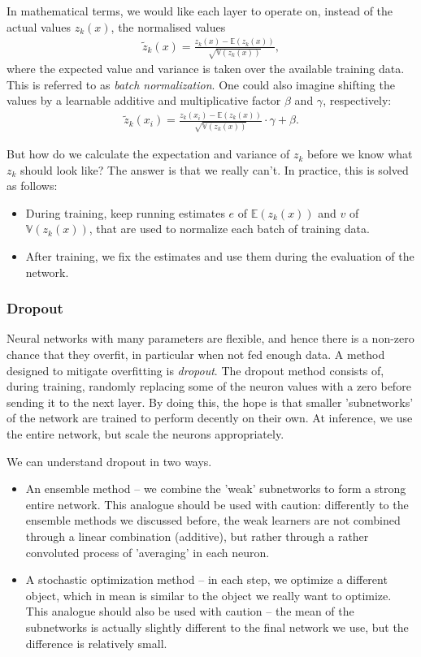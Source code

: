 \documentclass{article}
\begin{document}
In mathematical terms, we would like each layer to operate on, instead of the actual values $z_k(x)$, the normalised values
\begin{align*}
    \tilde{z}_k(x) = \frac{z_k(x) -\mathbb{E}(z_k(x))}{\sqrt{\mathbb{V}(z_k(x))}},
\end{align*}
where the expected value and variance is taken over the available training data. This is referred to as \emph{batch normalization}. One could also imagine shifting the values by a learnable additive and multiplicative factor $\beta$ and $\gamma$, respectively:
\begin{align*}
    \tilde{z}_k(x_i) = \frac{z_k(x_i) -\mathbb{E}(z_k(x))}{\sqrt{\mathbb{V}(z_k(x))}}\cdot \gamma + \beta.
\end{align*}

But how do we calculate the expectation and variance of $z_k$ before we know what $z_k$ should look like? The answer is that we really can't. In practice, this is solved as follows:
\begin{itemize}
    \item During training, keep running estimates $e$ of $\mathbb{E}(z_k(x))$ and $v$ of $\mathbb{V}(z_k(x))$, that are used to normalize each batch of training data.
    \item After training, we fix the estimates and use them during the evaluation of the network.
\end{itemize}


\subsubsection{Dropout} Neural networks with many parameters are flexible, and hence there is a non-zero chance that they overfit, in particular when not fed enough data. A method designed to mitigate overfitting is \emph{dropout}. The dropout method consists of, during training, randomly replacing some of the neuron values with a zero before sending it to the next layer. By doing this, the hope is that smaller 'subnetworks' of the network are trained to perform decently on their own. At inference, we use the entire network, but scale the neurons appropriately.

We can understand dropout in two ways.
\begin{itemize}
    \item An ensemble method -- we combine the 'weak' subnetworks to form a strong entire network. This analogue should be used with caution: differently to the ensemble methods we discussed before, the weak learners are not combined through a linear combination (additive), but rather through a rather convoluted process of 'averaging' in each neuron.
    \item A stochastic optimization method -- in each step, we optimize a different object, which in mean is similar to the object we really want to optimize. This analogue should also be used with caution -- the mean of the subnetworks is actually slightly different to the final network we use, but the difference is relatively small.
\end{itemize}
\end{document}
